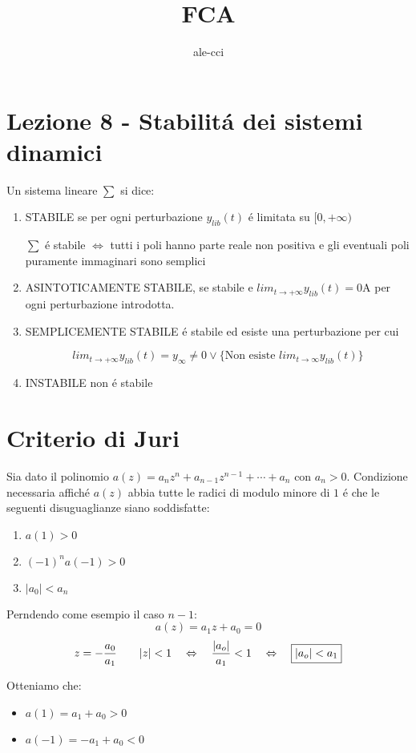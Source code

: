 \documentclass{article}
\title{FCA}
\author{ale-cci}
\begin{document}
\maketitle
\newpage
\section{Lezione 8 - Stabilit\'a dei sistemi dinamici}
Un sistema lineare $\sum$ si dice:
\begin{enumerate}
    \item STABILE se per ogni perturbazione $y_{lib}(t)$ \'e limitata su $[0,+\infty)$

        $\sum$ \'e stabile $\Leftrightarrow$ tutti i poli hanno parte reale non positiva e gli eventuali poli puramente immaginari sono semplici
    \item ASINTOTICAMENTE STABILE, se stabile e $lim_{t \to+\infty} y_{lib}(t) = 0$A per ogni perturbazione introdotta.
    \item SEMPLICEMENTE STABILE \'e stabile ed esiste una perturbazione  per cui

    \[ lim_{t \to +\infty} y_{lib}(t) = y_{\infty} \neq 0 \lor \big\{\text{Non esiste $lim_{t\to\infty} y_{lib}(t)$}\big\} \]
    \item INSTABILE non \'e stabile
\end{enumerate}

\newpage
\section{Criterio di Juri}
Sia dato il polinomio $a(z) = a_n z^n + a_{n-1} z^{n-1} + \cdots + a_n$ con $a_n > 0$. Condizione necessaria affich\'e $a(z)$ abbia tutte le radici di modulo minore di $1$ \'e che le seguenti disuguaglianze siano soddisfatte:

\begin{enumerate}
    \item $a(1) > 0$
    \item $(-1)^n a(-1) > 0$
    \item $|a_0| < a_n$
\end{enumerate}

Perndendo come esempio il caso $n - 1$:
\[ a(z) = a_1z + a_0 = 0 \]
\[ z = -\frac{a_0}{a_1} \qquad |z| < 1 \quad \Leftrightarrow \quad \frac{|a_o|}{a_1} < 1 \quad \Leftrightarrow\quad  \framebox{$|a_o| < a_1$} \]

Otteniamo che:
\begin{itemize}
    \item $ a(1) = a_1 + a_0 > 0$
    \item $ a(-1) = -a_1 + a_0 < 0$
\end{itemize}
\end{document}
